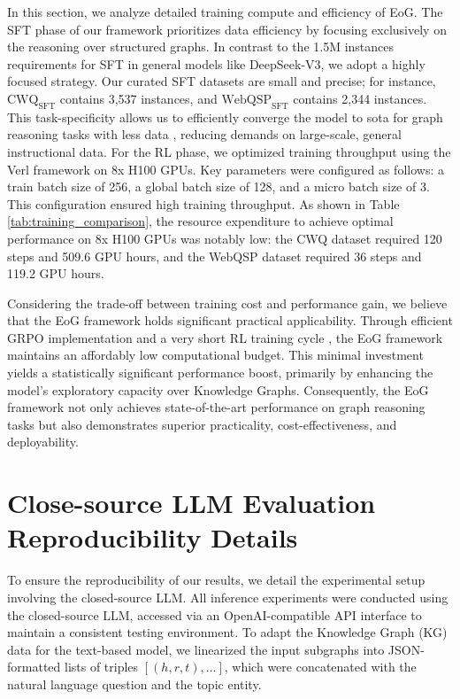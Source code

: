 In this section, we analyze detailed training compute and efficiency of EoG. The SFT phase of our framework prioritizes data efficiency by focusing exclusively on the reasoning over structured graphs. In contrast to the 1.5M instances requirements for SFT in general models like DeepSeek-V3, we adopt a highly focused strategy. Our curated SFT datasets are small and precise; for instance, $\text{CWQ}_{\text{SFT}}$ contains 3,537 instances, and $\text{WebQSP}_{\text{SFT}}$ contains 2,344 instances. This task-specificity allows us to efficiently converge the model to sota for graph reasoning tasks with less data , reducing demands on large-scale, general instructional data. 
For the RL phase, we optimized training throughput using the Verl framework on 8x H100 GPUs. Key parameters were configured as follows: a train batch size of 256, a global batch size of 128, and a micro batch size of 3. This configuration ensured high training throughput. As shown in Table \ref{tab:training_comparison}, the resource expenditure to achieve optimal performance on 8x H100 GPUs was notably low: the CWQ dataset required 120 steps and 509.6 GPU hours, and the WebQSP dataset required 36 steps and 119.2 GPU hours.

Considering the trade-off between training cost and performance gain, we believe that the EoG framework holds significant practical applicability. Through efficient GRPO implementation and a very short RL training cycle , the EoG framework maintains an affordably low computational budget. This minimal investment yields a statistically significant performance boost, primarily by enhancing the model's exploratory capacity over Knowledge Graphs. Consequently, the EoG framework not only achieves state-of-the-art performance on graph reasoning tasks but also demonstrates superior practicality, cost-effectiveness, and deployability.



\section{Close-source LLM Evaluation Reproducibility Details}


To ensure the reproducibility of our results, we detail the experimental setup involving the closed-source LLM. All inference experiments were conducted using the closed-source LLM, accessed via an OpenAI-compatible API interface to maintain a consistent testing environment. To adapt the Knowledge Graph (KG) data for the text-based model, we linearized the input subgraphs into JSON-formatted lists of triples $[(h, r, t), \dots]$, which were concatenated with the natural language question and the topic entity.

